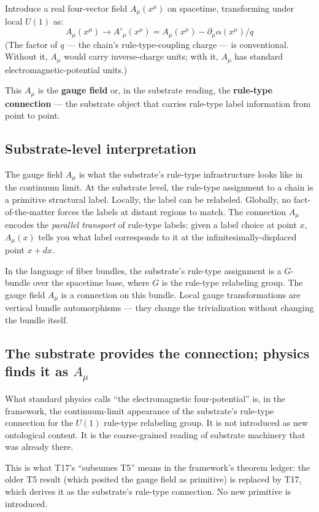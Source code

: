 \documentclass[11pt,a4paper]{article}
\begin{document}
Introduce a real four-vector field $A_\mu(x^\mu)$ on spacetime, transforming under local $U(1)$ as:
\[
A_\mu(x^\mu) \to A'_\mu(x^\mu) = A_\mu(x^\mu) - \partial_\mu \alpha(x^\mu)/q
\]
(The factor of $q$ --- the chain's rule-type-coupling charge --- is conventional. Without it, $A_\mu$ would carry inverse-charge units; with it, $A_\mu$ has standard electromagnetic-potential units.)

This $A_\mu$ is the \textbf{gauge field} or, in the substrate reading, the \textbf{rule-type connection} --- the substrate object that carries rule-type label information from point to point.

\subsection{Substrate-level interpretation}

The gauge field $A_\mu$ is what the substrate's rule-type infrastructure looks like in the continuum limit. At the substrate level, the rule-type assignment to a chain is a primitive structural label. Locally, the label can be relabeled. Globally, no fact-of-the-matter forces the labels at distant regions to match. The connection $A_\mu$ encodes the \emph{parallel transport} of rule-type labels: given a label choice at point $x$, $A_\mu(x)$ tells you what label corresponds to it at the infinitesimally-displaced point $x + dx$.

In the language of fiber bundles, the substrate's rule-type assignment is a $G$-bundle over the spacetime base, where $G$ is the rule-type relabeling group. The gauge field $A_\mu$ is a connection on this bundle. Local gauge transformations are vertical bundle automorphisms --- they change the trivialization without changing the bundle itself.

\subsection{The substrate provides the connection; physics finds it as $A_\mu$}

What standard physics calls ``the electromagnetic four-potential'' is, in the framework, the continuum-limit appearance of the substrate's rule-type connection for the $U(1)$ rule-type relabeling group. It is not introduced as new ontological content. It is the coarse-grained reading of substrate machinery that was already there.

This is what T17's ``subsumes T5'' means in the framework's theorem ledger: the older T5 result (which posited the gauge field as primitive) is replaced by T17, which derives it as the substrate's rule-type connection. No new primitive is introduced.
\end{document}
